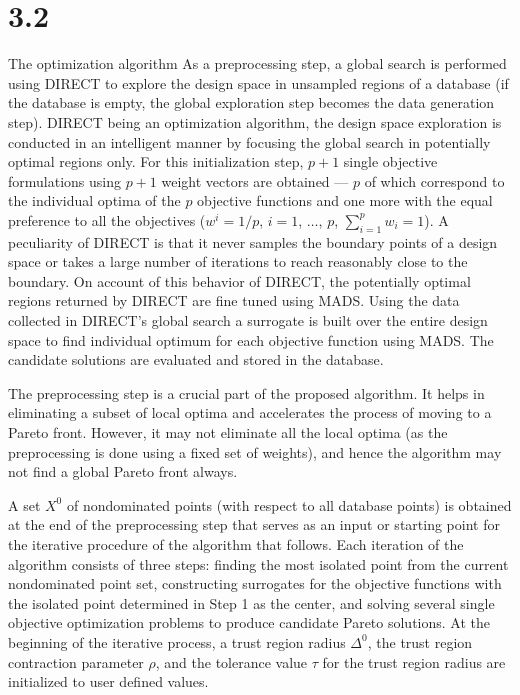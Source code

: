 \section{3.2}{The optimization algorithm} 
As a preprocessing step, a global search is performed using DIRECT to explore
the design space in unsampled regions of a database (if the database is empty,
the global exploration step becomes the data generation step). DIRECT being an
optimization algorithm, the design space exploration is conducted in an
intelligent manner by focusing the global search in potentially optimal regions
only. For this initialization step, $p+1$ single objective formulations using
$p+1$ weight vectors are obtained --- $p$ of which correspond to the individual
optima of the $p$ objective functions and one more with the equal preference to
all the objectives ($w^i=1/p$, $i=1$, $\ldots$, $p$, $\sum_{i=1}^{p}w_i=1$). 
A peculiarity of DIRECT is that it never samples the boundary 
points of a design space or takes a large number of iterations to reach 
reasonably close to the boundary. On account of this behavior of DIRECT, 
the potentially optimal regions returned by DIRECT are fine tuned using MADS. 
Using the data collected in DIRECT's global search a surrogate is built over 
the entire design space to find individual optimum for each objective function 
using MADS. The candidate solutions are evaluated and stored in the database.

The preprocessing step is a crucial part of the proposed algorithm. It helps 
in eliminating a subset of local optima and accelerates the process of moving 
to a Pareto front. However, it may not eliminate all the local optima (as 
the preprocessing is done using a fixed set of weights), and hence the 
algorithm may not find a global Pareto front always.    

A set $X^0$ of nondominated points (with respect to all database points) is
obtained at the end of the preprocessing step that serves as an input or
starting point for the iterative procedure of the algorithm that follows. 
Each iteration of the algorithm consists of three steps: finding the most 
isolated point from the current nondominated point set, constructing surrogates 
for the objective functions with the isolated point determined in Step 1 as 
the center, and solving several single objective optimization problems to 
produce candidate Pareto solutions. At the beginning of the iterative process, 
a  trust region radius $\Delta^0$, the trust region contraction parameter 
$\rho$, and the tolerance value $\tau$ for the trust region radius are 
initialized to user defined values. \smallskip

